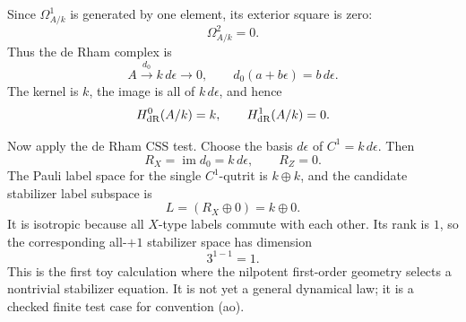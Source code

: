 Since \(\Omega^1_{A/k}\) is generated by one element, its exterior square is
zero:
\[
  \Omega^2_{A/k}=0.
\]
Thus the de Rham complex is
\[
  A\xrightarrow{d_0}k\,d\epsilon\longrightarrow0,
  \qquad
  d_0(a+b\epsilon)=b\,d\epsilon.
\]
The kernel is \(k\), the image is all of \(k\,d\epsilon\), and hence
\[
  H^0_{\rm dR}(A/k)=k,\qquad
  H^1_{\rm dR}(A/k)=0.
\]

Now apply the de Rham CSS test.  Choose the basis \(d\epsilon\) of
\(C^1=k\,d\epsilon\).  Then
\[
  R_X=\operatorname{im}d_0=k\,d\epsilon,\qquad
  R_Z=0.
\]
The Pauli label space for the single \(C^1\)-qutrit is \(k\oplus k\), and the
candidate stabilizer label subspace is
\[
  L=(R_X\oplus0)=k\oplus0.
\]
It is isotropic because all \(X\)-type labels commute with each other.  Its
rank is \(1\), so the corresponding all-\(+1\) stabilizer space has dimension
\[
  3^{1-1}=1.
\]
This is the first toy calculation where the nilpotent first-order geometry
selects a nontrivial stabilizer equation.  It is not yet a general dynamical
law; it is a checked finite test case for convention (ao).
